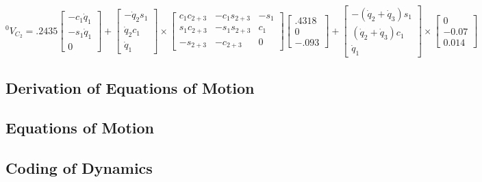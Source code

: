 $$
{}^{0}V_{C_{2}} = .2435 \begin{bmatrix} -c_1\dot{q}_1 \\ -s_1\dot{q}_1 \\ 0\end{bmatrix} + \left[\begin{array}{c} -\dot{q}_{2}s_{1} \\ \dot{q}_{2}c_{1} \\ \dot{q}_{1}
\end{array}\right] \times \left[\begin{array}{ccc}
c_{1} c_{2+3} & -c_{1} s_{2+3} & -s_{1} \\
s_{1} c_{2+3} & -s_{1} s_{2+3} & c_{1} \\
-s_{2+3} & -c_{2+3} & 0
\end{array}\right] \begin{bmatrix} .4318 \\ 0 \\ -.093 \end{bmatrix} + \begin{bmatrix}
-(\dot{q}_2 + \dot{q}_3)s_1 \\
(\dot{q}_2 + \dot{q}_3)c_1 \\
\dot{q}_1
\end{bmatrix} \times \begin{bmatrix}
0 \\ -0.07 \\ 0.014
\end{bmatrix}
$$




\subsection*{Derivation of Equations of Motion}






\subsection*{Equations of Motion}

\subsection*{Coding of Dynamics }

